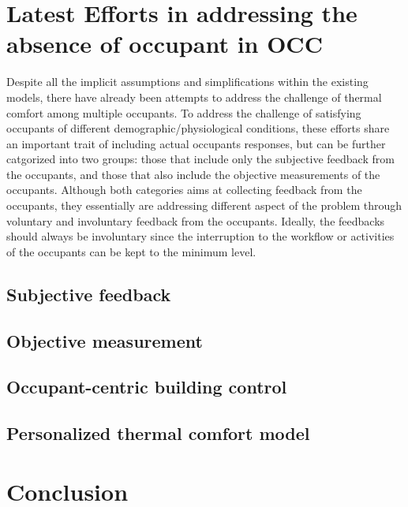 \documentclass[review]{elsarticle}
\begin{document}
\section{Latest Efforts in addressing the absence of occupant in OCC}
Despite all the implicit assumptions and simplifications within the existing models, there have already been attempts to address the challenge of thermal comfort among multiple occupants. To address the challenge of satisfying occupants of different demographic/physiological conditions, these efforts share an important trait of including actual occupants responses, but can be further catgorized into two groups: those that include only the subjective feedback from the occupants, and those that also include the objective measurements of the occupants\cite{bortolini_analysis_2019}. Although both categories aims at collecting feedback from the occupants, they essentially are addressing different aspect of the problem through voluntary and involuntary feedback from the occupants. Ideally, the feedbacks should always be involuntary since the interruption to the workflow or activities of the occupants can be kept to the minimum level. 
    \subsection{Subjective feedback}
    
    \subsection{Objective measurement}
    
        \subsection{Occupant-centric building control}
        \subsection{Personalized thermal comfort model}
        
\section{Conclusion}


\end{document}
